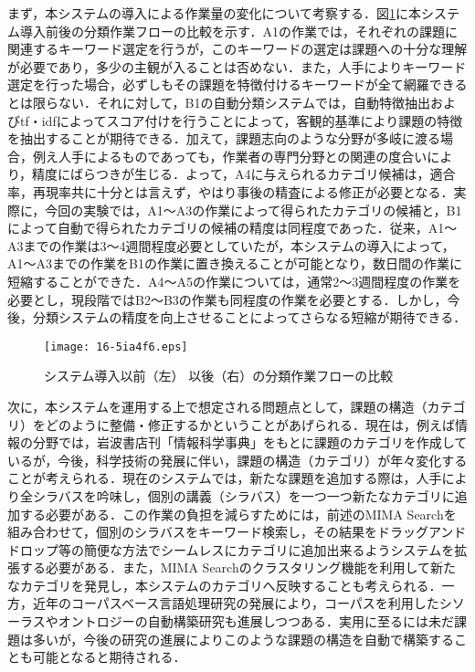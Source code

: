 \documentclass[japanese]{jnlp_1.4}
\begin{document}
まず，本システムの導入による作業量の変化について考察する．図\ref{fig:work_flow}に本システム導入前後の分類作業フローの比較を示す．A1の作業では，それぞれの課題に関連するキーワード選定を行うが，このキーワードの選定は課題への十分な理解が必要であり，多少の主観が入ることは否めない．また，人手によりキーワード選定を行った場合，必ずしもその課題を特徴付けるキーワードが全て網羅できるとは限らない．それに対して，B1の自動分類システムでは，自動特徴抽出およびtf・idfによってスコア付けを行うことによって，客観的基準により課題の特徴を抽出することが期待できる．加えて，課題志向のような分野が多岐に渡る場合，例え人手によるものであっても，作業者の専門分野との関連の度合いにより，精度にばらつきが生じる．よって，A4に与えられるカテゴリ候補は，適合率，再現率共に十分とは言えず，やはり事後の精査による修正が必要となる．実際に，今回の実験では，A1〜A3の作業によって得られたカテゴリの候補と，B1によって自動で得られたカテゴリの候補の精度は同程度であった．従来，A1〜A3までの作業は3〜4週間程度必要としていたが，本システムの導入によって，A1〜A3までの作業をB1の作業に置き換えることが可能となり，数日間の作業に短縮することができた．A4〜A5の作業については，通常2〜3週間程度の作業を必要とし，現段階ではB2〜B3の作業も同程度の作業を必要とする．しかし，今後，分類システムの精度を向上させることによってさらなる短縮が期待できる．

\begin{figure}[t]
\begin{center}
\texttt{[image: 16-5ia4f6.eps]}
\end{center}
\caption{システム導入以前（左）
以後（右）の分類作業フローの比較}
\label{fig:work_flow}
\end{figure}

次に，本システムを運用する上で想定される問題点として，課題の構造（カテゴリ）をどのように整備・修正するかということがあげられる．現在は，例えば情報の分野では，岩波書店刊「情報科学事典」をもとに課題のカテゴリを作成しているが，今後，科学技術の発展に伴い，課題の構造（カテゴリ）が年々変化することが考えられる．現在のシステムでは，新たな課題を追加する際は，人手により全シラバスを吟味し，個別の講義（シラバス）を一つ一つ新たなカテゴリに追加する必要がある．この作業の負担を減らすためには，前述のMIMA Searchを組み合わせて，個別のシラバスをキーワード検索し，その結果をドラッグアンドドロップ等の簡便な方法でシームレスにカテゴリに追加出来るようシステムを拡張する必要がある．また，MIMA Searchのクラスタリング機能を利用して新たなカテゴリを発見し，本システムのカテゴリへ反映することも考えられる．一方，近年のコーパスベース言語処理研究の発展により，コーパスを利用したシソーラスやオントロジーの自動構築研究\cite{Inproc_Mima_2002,Inproc_Shinzato_2004}も進展しつつある．実用に至るには未だ課題は多いが，今後の研究の進展によりこのような課題の構造を自動で構築することも可能となると期待される．
\end{document}
